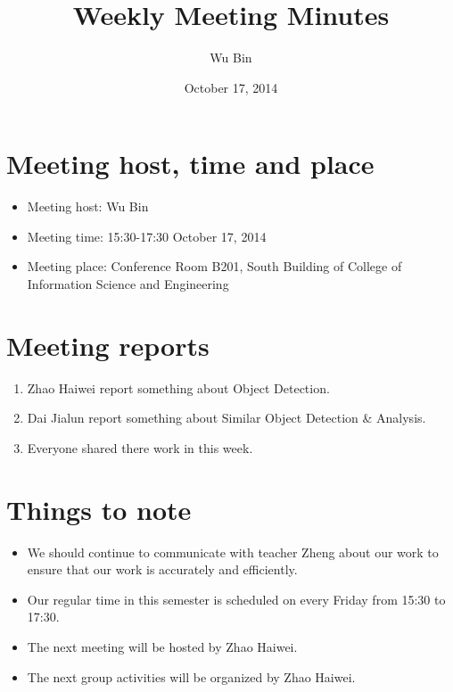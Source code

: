 \documentclass[a4paper，12pt]{article}
\title{Weekly Meeting Minutes}
\author{Wu Bin}
\date{October 17, 2014}
\begin{document}
\maketitle

\section{Meeting host, time and place}

\begin{itemize}
\item Meeting host: Wu Bin
\item Meeting time: 15:30-17:30 October 17, 2014 
\item Meeting place: Conference Room B201, South Building of College of Information Science and Engineering 
\end{itemize}

\section{Meeting reports}

\begin{enumerate}
\item Zhao Haiwei report something about Object Detection.
\item Dai Jialun report something about Similar Object Detection \& Analysis.
\item Everyone shared there work in this week.
\end{enumerate}

\section {Things to note}

\begin{itemize}
\item We should continue to communicate with teacher Zheng about our work to ensure that our work is accurately and efficiently.
\item Our regular time in this semester is scheduled on every Friday from 15:30 to 17:30.
\item The next meeting will be hosted by Zhao Haiwei.
\item The next group activities will be organized by Zhao Haiwei.
\end{itemize}
\end{document}
